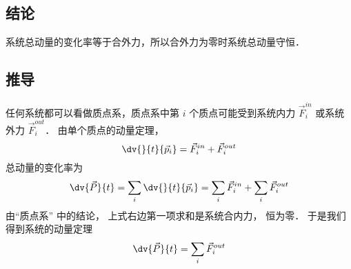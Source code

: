 
\subsection{结论}
系统总动量的变化率等于合外力，所以合外力为零时系统总动量守恒．

\subsection{推导}
任何系统都可以看做质点系，质点系中第 $i$ 个质点可能受到系统内力 $\vec F_i^{in}$ 或系统外力 $\vec F_i^{out}$． 由单个质点的动量定理，
\begin{equation}
\dv{}{t}{\vec p_i} = \vec F_i^{in} + \vec F_i^{out}
\end{equation}
总动量的变化率为
\begin{equation}
\dv{\vec P}{t} = \sum\limits_i {\dv{}{t}{{\vec p}_i}}  = \sum\limits_i {\vec F_i^{in}}  + \sum\limits_i {\vec F_i^{out}}
\end{equation}
由“质点系” 中的结论， 上式右边第一项求和是系统合内力， 恒为零． 于是我们得到系统的动量定理
\begin{equation}
\dv{\vec P}{t} = \sum\limits_i {\vec F_i^{out}} 
\end{equation}

